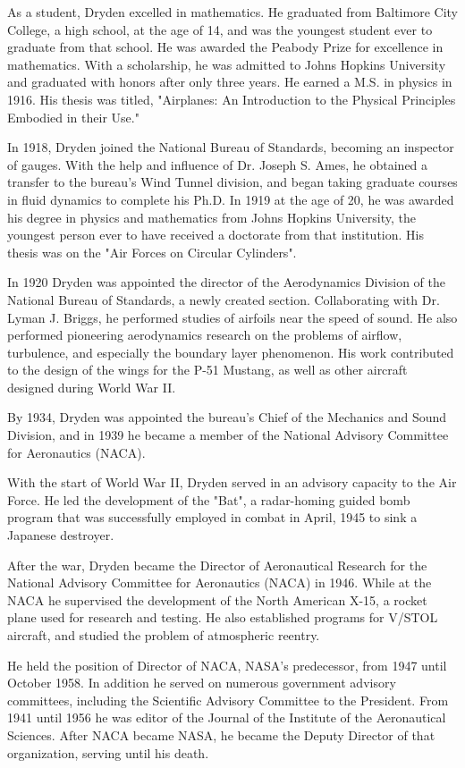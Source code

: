 As a student, Dryden excelled in mathematics. He graduated from
Baltimore City College, a high school, at the age of 14, and was the
youngest student ever to graduate from that school. He was awarded the
Peabody Prize for excellence in mathematics. With a scholarship, he was
admitted to Johns Hopkins University and graduated with honors after
only three years. He earned a M.S. in physics in 1916. His thesis was
titled, "Airplanes: An Introduction to the Physical Principles Embodied
in their Use."

In 1918, Dryden joined the National Bureau of Standards, becoming an
inspector of gauges. With the help and influence of Dr. Joseph S. Ames,
he obtained a transfer to the bureau's Wind Tunnel division, and began
taking graduate courses in fluid dynamics to complete his Ph.D. In 1919
at the age of 20, he was awarded his degree in physics and mathematics
from Johns Hopkins University, the youngest person ever to have received
a doctorate from that institution. His thesis was on the "Air Forces on
Circular Cylinders".

In 1920 Dryden was appointed the director of the Aerodynamics Division
of the National Bureau of Standards, a newly created section.
Collaborating with Dr. Lyman J. Briggs, he performed studies of airfoils
near the speed of sound. He also performed pioneering aerodynamics
research on the problems of airflow, turbulence, and especially the
boundary layer phenomenon. His work contributed to the design of the
wings for the P-51 Mustang, as well as other aircraft designed during
World War II.

By 1934, Dryden was appointed the bureau's Chief of the Mechanics and
Sound Division, and in 1939 he became a member of the National Advisory
Committee for Aeronautics (NACA).

With the start of World War II, Dryden served in an advisory capacity to
the Air Force. He led the development of the "Bat", a radar-homing
guided bomb program that was successfully employed in combat in April,
1945 to sink a Japanese destroyer.

After the war, Dryden became the Director of Aeronautical Research for
the National Advisory Committee for Aeronautics (NACA) in 1946. While at
the NACA he supervised the development of the North American X-15, a
rocket plane used for research and testing. He also established programs
for V/STOL aircraft, and studied the problem of atmospheric reentry.

He held the position of Director of NACA, NASA's predecessor, from 1947
until October 1958. In addition he served on numerous government
advisory committees, including the Scientific Advisory Committee to the
President. From 1941 until 1956 he was editor of the Journal of the
Institute of the Aeronautical Sciences. After NACA became NASA, he
became the Deputy Director of that organization, serving until his
death.

